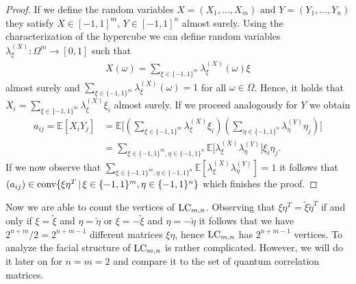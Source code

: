 \begin{proof}
	\noindent If we define the random variables $ X= (X_1,\hdots,X_m) $ and $ Y= (Y_1,\hdots,Y_n) $ they satisfy $ X \in [-1,1]^m, \, Y \in [-1,1]^n $ almost surely. Using the characterization of the hypercube we can define random variables $ \lambda_{\xi}^{(X)}: \Omega^m \to [0,1] $ such that 
	\begin{align*}
		X(\omega) = \sum_{\xi \in \{-1,1\}^m}\lambda_{\xi}^{(X)}(\omega)\xi
	\end{align*} 
	almost surely 
	and $ \sum_{\xi \in \{-1,1\}^m}\lambda_{\xi}^{(X)}(\omega) = 1  $ for all $ \omega \in \Omega $. Hence, it holds that 
	$X_i =  \sum_{\xi \in \{-1,1\}^m}\lambda_{\xi}^{(X)}\xi_i $ almost surely.
	If we proceed analogously for $ Y $ we obtain
	\begin{align*}
		a_{ij} = \mathbb{E}[X_iY_j] &= \mathbb{E} \big [  (\sum_{\xi \in \{-1,1\}^m}\lambda_{\xi}^{(X)}\xi_i ) (\sum_{\eta \in \{-1,1\}^n}\lambda_{\eta}^{(Y)}\eta_j ) \big ]   \\
		&= \sum_{\xi \in \{-1,1\}^m, \eta \in \{-1,1\}^n} \mathbb{E}\big [\lambda_{\xi}^{(X)}\lambda_{\eta}^{(Y)} \big ] \xi_i \eta_j.
	\end{align*}
	If we now observe that $
		\sum_{\xi \in \{-1,1\}^m, \eta \in \{-1,1\}^n}\mathbb{E} [\lambda_{\xi}^{(X)}\lambda_{\eta}^{(Y)}] = 1 $ it follows that $ (a_{ij}) \in  \textup{conv} \{  \xi\eta^T \, | \, \xi \in \{-1,1\}^m, \eta \in \{-1,1\}^n   \}$
 which finishes the proof.
\end{proof}
\noindent Now we are able to count the vertices of $ \textup{LC}_{m,n} $. Observing that $ \xi \eta^T = \tilde{\xi} \tilde{\eta}^T $ if and only if $ \xi = \tilde{\xi} $ and $ \eta = \tilde{\eta} $ or $ \xi = -\tilde{\xi} $ and $ \eta = -\tilde{\eta} $ it follows that we have $ 2^{n+m}/2 = 2^{n+m-1} $ different matrices $ \xi \eta $, hence $ \textup{LC}_{m,n} $ has $ 2^{n+m-1} $ vertices. To analyze the facial structure of $ \textup{LC}_{m,n} $ is rather complicated. 
However, we will do it later on for $ n=m=2 $ and compare it to the set of quantum correlation matrices. 

